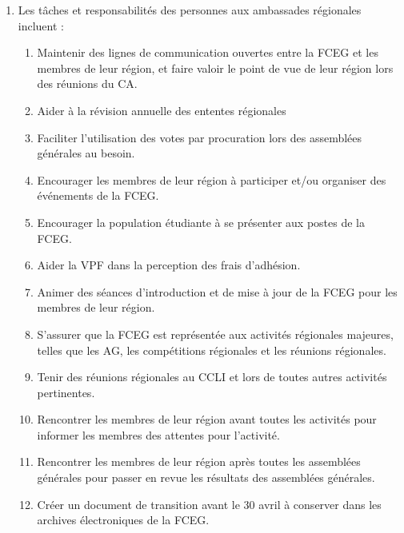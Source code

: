 \begin{enumerate}
 \item Les tâches et responsabilités des personnes aux ambassades régionales incluent :
  \begin{enumerate}
   \item Maintenir des lignes de communication ouvertes entre la FCEG et les membres de leur région, et faire valoir le point de vue de leur région lors des réunions du CA.
   \item Aider à la révision annuelle des ententes régionales
   \item Faciliter l'utilisation des votes par procuration lors des assemblées générales au besoin.
   \item Encourager les membres de leur région à participer et/ou organiser des événements de la FCEG.
   \item Encourager la population étudiante à se présenter aux postes de la FCEG.
   \item Aider la VPF dans la perception des frais d'adhésion.
   \item Animer des séances d'introduction et de mise à jour de la FCEG pour les membres de leur région.
   \item S'assurer que la FCEG est représentée aux activités régionales majeures, telles que les AG, les compétitions régionales et les réunions régionales.
   \item Tenir des réunions régionales au CCLI et lors de toutes autres activités pertinentes.
   \item Rencontrer les membres de leur région avant toutes les activités pour informer les membres des attentes pour l'activité.
   \item Rencontrer les membres de leur région après toutes les assemblées générales pour passer en revue les résultats des assemblées générales.
   \item Créer un document de transition avant le 30 avril à conserver dans les archives électroniques de la FCEG.
  \end{enumerate}
\end{enumerate}
